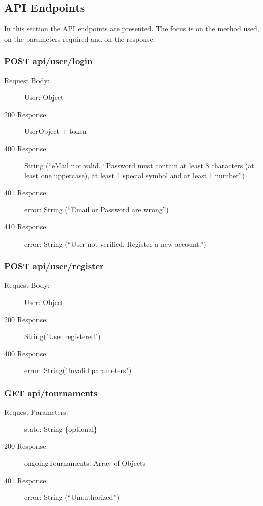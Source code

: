 \documentclass{Configuration_Files/Template}
\begin{document}
\subsection{API Endpoints}
In this section the API endpoints are presented. The focus is on the method used, on the parameters required and on the response.

\subsubsection{POST api/user/login}
\begin{description}
    \item[Request Body:] User: Object
    \item[200 Response:] UserObject + token
    \item[400 Response:] String (“eMail not valid, “Password must contain at least 8 characters (at least one uppercase), at least 1 special symbol and at least 1 number”)
    \item[401 Response:] error: String (“Email or Password are wrong”)
    \item[410 Response:] error: String (“User not verified. Register a new account.”)
\end{description}

\subsubsection{POST api/user/register}
\begin{description}
    \item[Request Body:] User: Object
    \item[200 Response:] String("User registered")
    \item[400 Response:] error :String("Invalid parameters")
\end{description}

\subsubsection{GET api/tournaments}
\begin{description}
    \item[Request Parameters:] state: String \{optional\}
    \item[200 Response:] ongoingTournaments: Array of Objects
    \item[401 Response:] error: String (“Unauthorized”)
\end{description}
\end{document}
